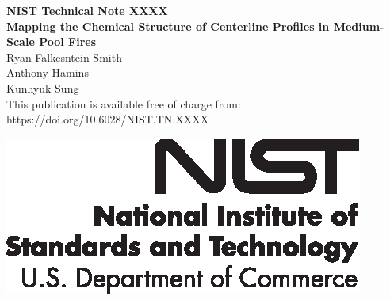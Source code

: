 \documentclass[12pt]{article}
\newcommand{\pubnumber}{XXXX}
\newcommand{\DOI}{https://doi.org/10.6028/NIST.TN.XXXX}
\begin{document}
	
	\begin{titlepage}
		\begin{flushright}
\LARGE{\textbf{NIST Technical Note \pubnumber}}\\
\vfill
\Huge{\textbf{Mapping the Chemical Structure of Centerline Profiles in Medium-Scale Pool Fires}}\\
\vfill
\large Ryan Falkesntein-Smith\\
\large Anthony Hamins\\
\large Kunhyuk Sung\\
\vfill
\normalsize This publication is available free of charge from:\\
\DOI\\
\vfill

\includegraphics[width=0.3\linewidth]{NIST-logo.eps}\\ 


\end{flushright}
\end{titlepage}
\end{document}
